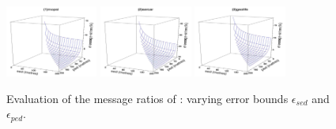 {\begin{figure}[tb!]
	\centering
	\includegraphics[width= 0.27\textwidth]{figures/Fig-BITT-mopsi-total-messages.png}\hspace{6ex}
	\includegraphics[width= 0.27\textwidth]{figures/Fig-BITT-sercar-total-messages.png}\hspace{6ex}
	\includegraphics[width= 0.27\textwidth]{figures/Fig-BITT-geolife-total-messages.png}\hspace{0ex}
	\vspace{-2ex}
	\caption{\small Evaluation of the message ratios of \bitt: varying error bounds $\epsilon_{sed}$ and $\epsilon_{ped}$.}
	\label{fig:bitt-total-message}
	\vspace{-1ex}
\end{figure}




}
